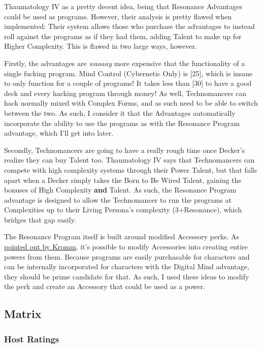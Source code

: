 \begin{multicols*}{2}
	Thaumatology IV as a pretty decent idea, being that Resonance Advantages could be used as programs. However, their analysis is pretty flawed when implemented: Their system allows those who purchase the advantages to instead roll against the programs as if they had them, adding Talent to make up for Higher Complexity. This is flawed in two large ways, however.
	
	Firstly, the advantages are \textit{waaaay} more expensive that the functionality of a single fucking program. Mind Control (Cybernetic Only) is [25], which is insane to only function for a couple of programs! It takes less than [30] to have a good deck and every hacking program through money! As well, Technomancers can hack normally mixed with Complex Forms, and as such need to be able to switch between the two. As such, I consider it that the Advantages automatically incorporate the ability to use the programs as with the Resonance Program advantage, which I'll get into later.
	
	Secondly, Technomancers are going to have a really rough time once Decker's realize they can buy Talent too. Thaumatology IV says that Technomancers can compete with high complexity systems through their Power Talent, but that falls apart when a Decker simply takes the Born to Be Wired Talent, gaining the bonuses of High Complexity \textbf{and} Talent. As such, the Resonance Program advantage is designed to allow the Technomancer to run the programs at Complexities up to their Living Persona's complexity (3+Resonance), which bridges that gap easily.
	
	The Resonance Program itself is built around modified Accessory perks. As \textcolor{NavyBlue}{\href{http://forums.sjgames.com/showpost.php?p=561052&postcount=8}{pointed out by Kromm}}, it's possible to modify Accessories into creating entire powers from them. Because programs are easily purchasable for characters and can be internally incorporated for characters with the Digital Mind advantage, they should be prime candidate for that. As such, I used these ideas to modify the perk and create an Accessory that could be used as a power.	
	
	\subsection{Matrix}
	
	\subsubsection{Host Ratings} \label{Host Ratings BTS}
	

\end{multicols*}
